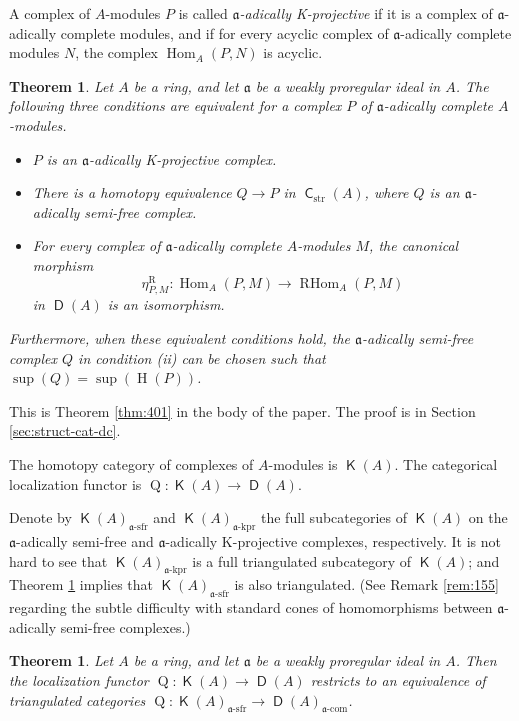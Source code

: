 \documentclass[10pt]{amsart}
\newtheorem{thm}[equation]{Theorem}
\theoremstyle{definition}
\numberwithin{equation}{section}
\newcommand{\opn}{\operatorname}
\newcommand{\cat}[1]{\operatorname{\mathsf{#1}}}
\newcommand{\rmitem}[1]{\item[\textrm{(#1)}]}
\newcommand{\mfrak}[1]{\mathfrak{#1}}
\newcommand{\mrm}[1]{\mathrm{#1}}
\renewcommand{\a}{\mfrak{a}}
\newcommand{\tup}[1]{\textrm{#1}}
\begin{document}
A complex of $A$-modules $P$ is called {\em $\a$-adically K-projective} if it
is a complex of $\a$-adically complete modules, and if for every acyclic complex
of $\a$-adically complete modules $N$, the complex
$\opn{Hom}_{A}(P, N)$ is acyclic.

\begin{thm} \label{thm:437}
Let $A$ be a ring, and let $\a$ be a weakly proregular ideal in $A$.
The following three conditions are equivalent for a complex $P$ of $\a$-adically
complete $A$-modules.
\begin{itemize}
\rmitem{i} $P$ is an $\a$-adically K-projective complex.

\rmitem{ii} There is a homotopy equivalence
$Q \to P$ in $\cat{C}_{\mrm{str}}(A)$, where $Q$ is an
$\a$-adically semi-free complex.

\rmitem{iii} For every complex of $\a$-adically complete $A$-modules
$M$, the canonical morphism
\[ \eta^{\mrm{R}}_{P, M} : \opn{Hom}_{A}(P, M) \to \opn{RHom}_{A}(P, M) \]
in $\cat{D}(A)$ is an isomorphism.
\end{itemize}
Furthermore, when these equivalent conditions hold, the $\a$-adically
semi-free complex $Q$ in condition {\rm (ii)} can be chosen such that
$\opn{sup}(Q) = \opn{sup}(\opn{H}(P))$.
\end{thm}

This is Theorem \ref{thm:401} in the body of the paper. The proof is in
Section \ref{sec:struct-cat-dc}.

The homotopy category of complexes of $A$-modules is $\cat{K}(A)$.
The categorical localization functor is
$\opn{Q} : \cat{K}(A) \to \cat{D}(A)$.

Denote by $\cat{K}(A)_{\tup{$\a$-sfr}}$ and
$\cat{K}(A)_{\tup{$\a$-kpr}}$ the full subcategories of $\cat{K}(A)$ on
the $\a$-adically semi-free and $\a$-adically K-projective complexes,
respectively. It is not hard to see that
$\cat{K}(A)_{\tup{$\a$-kpr}}$ is a full triangulated subcategory
of $\cat{K}(A)$; and Theorem \ref{thm:437} implies that
$\cat{K}(A)_{\tup{$\a$-sfr}}$ is also triangulated.
(See Remark \ref{rem:155} regarding the subtle difficulty with standard
cones of homomorphisms between $\a$-adically semi-free complexes.)

\begin{thm} \label{thm:233}
Let $A$ be a ring, and let $\a$ be a weakly proregular ideal in $A$.
Then the localization functor
$\opn{Q} : \cat{K}(A) \to \cat{D}(A)$
restricts to an equivalence of triangulated categories
$\opn{Q} : \cat{K}(A)_{\tup{$\a$-sfr}} \to \cat{D}(A)_{\tup{$\a$-com}}$.
\end{thm}
\end{document}
